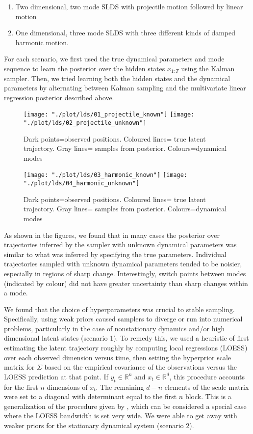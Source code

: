 \documentclass{article} %
\begin{document}
\begin{enumerate}
\item Two dimensional, two mode SLDS with projectile motion followed by linear motion
\item One dimensional, three mode SLDS with three different kinds of damped harmonic motion.
\end{enumerate}

For each scenario, we first used the true dynamical parameters and mode sequence to learn the posterior over the hidden states $x_{1:T}$ using the Kalman sampler. Then, we tried learning both the hidden states and the dynamical parameters by alternating between Kalman sampling and the multivariate linear regression posterior described above.

\begin{figure}
  \centering
  \texttt{[image: "./plot/lds/01\_projectile\_known"]}
   \texttt{[image: "./plot/lds/02\_projectile\_unknown"]}
   \caption{Dark points=observed positions. Coloured lines= true latent trajectory. Gray lines= samples from posterior. Colours=dynamical modes}
\end{figure}

\begin{figure}
  \texttt{[image: "./plot/lds/03\_harmonic\_known"]}
  \texttt{[image: "./plot/lds/04\_harmonic\_unknown"]}
  \caption{Dark points=observed positions. Coloured lines= true latent trajectory. Gray lines= samples from posterior. Colours=dynamical modes}
\end{figure}
\clearpage

As shown in the figures, we found that in many cases the posterior over trajectories inferred by the sampler with unknown dynamical parameters was similar to what was inferred by specifying the true parameters. Individual trajectories sampled with unknown dynamical parameters tended to be noisier, especially in regions of sharp change. Interestingly, switch points between modes (indicated by colour) did not have greater uncertainty than sharp changes within a mode.

We found that the choice of hyperparameters was crucial to stable sampling. Specifically, using weak priors caused samplers to diverge or run into numerical problems, particularly in the case of nonstationary dynamics and/or high dimensional latent states (scenario 1). To remedy this, we used a heuristic of first estimating the latent trajectory roughly by computing local regressions (LOESS) over each observed dimension versus time, then setting the hyperprior scale matrix for $\Sigma$ based on the empirical covariance of the observations versus the LOESS prediction at that point. If $y_t\in\mathbb{R}^n$ and $x_t\in\mathbb{R}^d$, this procedure accounts for the first $n$ dimensions of $x_t$. The remaining $d-n$ elements of the scale matrix were set to a diagonal with determinant equal to the first $n$ block. This is a generalization of the procedure given by \cite{fox_bayesian_2009}, which can be considered a special case where the LOESS bandwidth is set very wide. We were able to get away with weaker priors for the stationary dynamical system (scenario 2).
\end{document}
